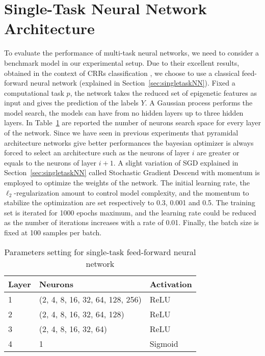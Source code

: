 \section{Single-Task Neural Network Architecture} 
\label{sec:exp_setup_singletask}
To evaluate the performance of multi-task neural networks, we need to consider a benchmark model in our experimental setup. Due to their excellent results, obtained in the context of CRRs classification \cite{WassermannDECRES}, we choose to use a classical feed-forward neural network (explained in Section~\ref{sec:singletaskNN}). Fixed a computational task $p$, the network takes the reduced set of epigenetic features as input and gives the prediction of the labels $Y$. A Gaussian process performs the model search, the models can have from no hidden layers up to three hidden layers. In Table~\ref{tab:mlp_single_arch} are reported the number of neurons search space for every layer of the network. Since we have seen in previous experiments that pyramidal architecture networks give better performances the bayesian optimizer is always forced to select an architecture such as the neurons of layer $i$ are greater or equals to the neurons of layer $i+1$. 
A slight variation of SGD explained in Section~\ref{sec:singletaskNN} called Stochastic Gradient Descend with momentum is employed to optimize the weights of the network. The initial learning rate, the $\ell_2$-regularization amount to control model complexity, and the momentum to stabilize the optimization are set respectively to 0.3, 0.001 and 0.5. The training set is iterated for 1000 epochs maximum, and the learning rate could be reduced as the number of iterations increases with a rate of 0.01. Finally, the batch size is fixed at 100 samples per batch.  
\begin{table}[t]
\centering
\begin{tabular}{lll}
\toprule
\textbf{Layer} & \textbf{Neurons} & \textbf{Activation} \\ 
\midrule
1 & (2, 4, 8, 16, 32, 64, 128, 256) & ReLU \\ 
2 & (2, 4, 8, 16, 32, 64, 128) & ReLU \\ 
3 & (2, 4, 8, 16, 32, 64) & ReLU \\ 
4 & 1 & Sigmoid \\ 
\bottomrule
\end{tabular}
\caption{Parameters setting for single-task feed-forward neural network}
\label{tab:mlp_single_arch}
\end{table}

